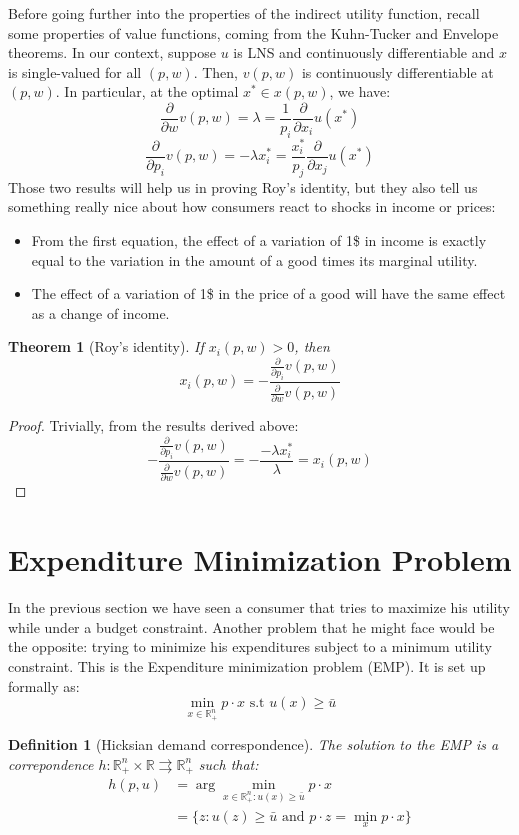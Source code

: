 \documentclass[12pt]{report}
\newtheorem{theorem}{Theorem}[chapter]
\newtheorem{definition}{Definition}[chapter]
\begin{document}
Before going further into the properties of the indirect utility function, recall some properties of value functions, coming from the Kuhn-Tucker and Envelope theorems. In our context, suppose $u$ is LNS and continuously differentiable and $x$ is single-valued for all $(p,w)$. Then, $v(p,w)$ is continuously differentiable at $(p,w)$. In particular, at the optimal $x^*\in x(p,w)$, we have: $$\frac{\partial}{\partial w}v(p,w) = \lambda = \frac{1}{p_i}\frac{\partial}{\partial x_i}u(x^*) $$ $$\frac{\partial}{\partial p_i}v(p,w) = -\lambda x_i^* = \frac{x_i^*}{p_j}\frac{\partial}{\partial x_j}u(x^*) $$ Those two results will help us in proving Roy's identity, but they also tell us something really nice about how consumers react to shocks in income or prices:\begin{itemize}
\item From the first equation, the effect of a variation of 1\$ in income is exactly equal to the variation in the amount of a good times its marginal utility.
\item The effect of a variation of 1\$ in the price of a good will have the same effect as a change of income.
\end{itemize}

\begin{theorem}[Roy's identity]
If $x_i(p,w)>0$, then $$x_i(p,w) = -\frac{\frac{\partial}{\partial p_i}v(p,w)}{\frac{\partial}{\partial w}v(p,w)} $$
\end{theorem}
\begin{proof}
Trivially, from the results derived above: $$-\frac{\frac{\partial}{\partial p_i}v(p,w)}{\frac{\partial}{\partial w}v(p,w)} = - \frac{-\lambda x_i^*}{\lambda} = x_i(p,w) $$
\end{proof}

\section{Expenditure Minimization Problem}

In the previous section we have seen a consumer that tries to maximize his utility while under a budget constraint. Another problem that he might face would be the opposite: trying to minimize his expenditures subject to a minimum utility constraint. This is the Expenditure minimization problem (EMP). It is set up formally as: $$\min_{x\in\mathbb{R}_{+}^n} p\cdot x \text{ s.t } u(x)\geq \bar u $$

\begin{definition}[Hicksian demand correspondence]
The solution to the EMP is a correpondence $h:\mathbb{R}_{+}^n \times \mathbb{R} \rightrightarrows \mathbb{R}_{+}^n $ such that: \begin{align*}
h(p, u) & = \operatorname{arg}\min_{x\in\mathbb{R}_{+}^n:u(x)\geq\bar u} p\cdot x \\
& = \{z : u(z)\geq\bar u\text{ and } p\cdot z = \min_{x} p\cdot x\}
\end{align*}
\end{definition}
\end{document}
